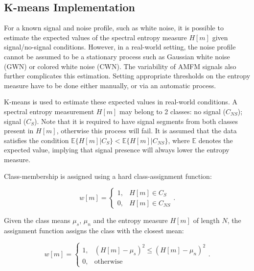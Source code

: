 \pagebreak
\begin{subappendices}
	\section{K-means Implementation}
	\label{app:kmeans}
	For a known signal and noise profile, such as white noise, it is possible to estimate the expected values of the spectral entropy measure $H[m]$ given signal/no-signal conditions. However, in a real-world setting, the noise profile cannot be assumed to be a stationary process such as Gaussian white noise (GWN) or colored white noise (CWN). The variability of AMFM signals also further complicates this estimation. Setting appropriate thresholds on the entropy measure have to be done either manually, or via an automatic process. 
	
	K-means is used to estimate these expected values in real-world conditions. A spectral entropy measurement $H[m]$ may belong to 2 classes: no signal ($C_{NS}$); signal ($C_S$). Note that it is required to have signal segments from both classes present in $H[m]$, otherwise this process will fail. It is assumed that the data satisfies the condition $\mathbb{E}\{H[m] | C_{S}\} < \mathbb{E}\{H[m] | C_{NS}\}$, where $\mathbb{E}$ denotes the expected value, implying that signal presence will always lower the entropy measure.
	
	Class-membership is assigned using a hard class-assignment function:
	
	\begin{equation*}
		w[m] = \begin{cases}
			1, & H[m] \in C_S\\
			0, & H[m] \in C_{NS}
		\end{cases}.
	\end{equation*}
	
	Given the class means $\mu_s$, $\mu_n$ and the entropy measure $H[m]$ of length $N$, the assignment function assigns the class with the closest mean:
	
	\begin{equation} 
	\label{eqn:classassign}
		w[m] = \begin{cases}
			1, & (H[m] - \mu_s)^2 \leq (H[m] - \mu_n)^2 \\
			0, & \text{otherwise}
		\end{cases}.
	\end{equation}
	

\end{subappendices}
